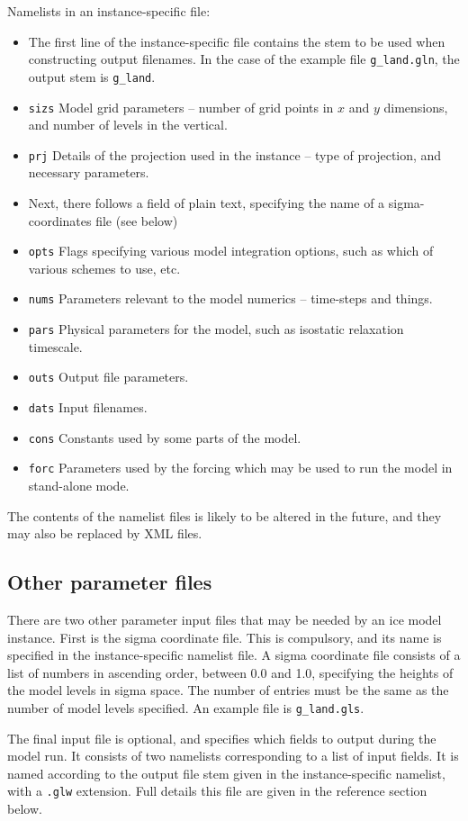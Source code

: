 \documentclass[11pt]{article}
\begin{document}
Namelists in an instance-specific file:
%
\begin{itemize}
\item The first line of the instance-specific file contains the stem to be
  used when constructing output filenames. In the case of the example file
  \texttt{g\_land.gln}, the output stem is \texttt{g\_land}.
\item \texttt{sizs} Model grid parameters -- number of grid points in $x$ and
  $y$ dimensions, and number of levels in the vertical.
\item \texttt{prj} Details of the projection used in the instance -- type of
  projection, and necessary parameters.
\item Next, there follows a field of plain text, specifying the name of a
  sigma-coordinates file (see below)
\item \texttt{opts} Flags specifying various model integration options, such
  as which of various schemes to use, etc.
\item \texttt{nums} Parameters relevant to the model numerics -- time-steps and
  things.
\item \texttt{pars} Physical parameters for the model, such as isostatic
  relaxation timescale.
\item \texttt{outs} Output file parameters.
\item \texttt{dats} Input filenames.
\item \texttt{cons} Constants used by some parts of the model.
\item \texttt{forc} Parameters used by the forcing which may be used to run
  the model in stand-alone mode.
\end{itemize}
%
The contents of the namelist files is likely to be altered in the future, and
they may also be replaced by XML files.
%
\subsection{Other parameter files}
%
There are two other parameter input files that may be needed by an ice model instance. First
is the sigma coordinate file. This is compulsory, and its name is specified in
the instance-specific namelist file. A sigma coordinate file consists of a
list of numbers in ascending order, between 0.0 and 1.0, specifying the
heights of the model levels in sigma space. The number of entries must be the
same as the number of model levels specified. An example file is
\texttt{g\_land.gls}.

The final input file is optional, and specifies which fields to output during
the model run. It consists of two namelists corresponding to a list of input
fields. It is named according to the output file stem given in the
instance-specific namelist, with a \texttt{.glw} extension. Full details this
file are given in the reference section below.
%
\end{document}
